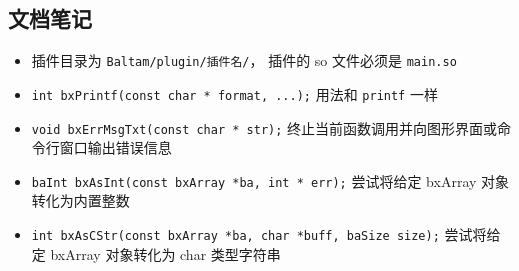 \subsection{文档笔记}
\begin{itemize}
\item 插件目录为 \verb|Baltam/plugin/插件名/|， 插件的 so 文件必须是 \verb|main.so|
\item \verb|int bxPrintf(const char * format, ...);| 用法和 \verb|printf| 一样
\item \verb|void bxErrMsgTxt(const char * str);| 终止当前函数调用并向图形界面或命令行窗口输出错误信息
\item \verb|baInt bxAsInt(const bxArray *ba, int * err);| 尝试将给定 bxArray 对象转化为内置整数
\item \verb|int bxAsCStr(const bxArray *ba, char *buff, baSize size);| 尝试将给定 bxArray 对象转化为 char 类型字符串
\end{itemize}


